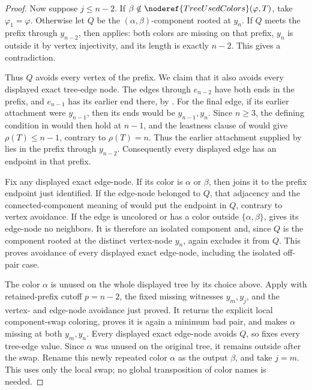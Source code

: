 \begin{proof}
Now suppose \(j\le n-2\).  If \(\beta\notin
\noderef{TreeUsedColors}(\varphi,T)\), take \(\varphi_1=\varphi\).
Otherwise let \(Q\) be the \((\alpha,\beta)\)-component rooted at
\(y_n\).  If \(Q\) meets the prefix through \(y_{n-2}\), then
 applies: both colors
are missing on that prefix, \(y_n\) is outside it by vertex injectivity,
and its length is exactly \(n-2\).  This gives a contradiction.

Thus \(Q\) avoids every vertex of the prefix.  We claim that it also
avoids every displayed exact tree-edge node.  The edges through
\(e_{n-2}\) have both ends in the prefix, and \(e_{n-1}\) has its earlier
end there, by .  For the final edge, if its earlier
attachment were \(y_{n-1}\), then its ends would be
\(y_{n-1},y_n\).  Since \(n\ge3\), the defining condition in
 would then hold at \(n-1\), and the
leastness clause of  would give
\(\rho(T)\le n-1\), contrary to \(\rho(T)=n\).  Thus the earlier
attachment supplied by  lies in the prefix through
\(y_{n-2}\).  Consequently every displayed edge has an endpoint in that
prefix.

Fix any displayed exact edge-node.  If its color is \(\alpha\) or
\(\beta\), then  joins it to the
prefix endpoint just identified.  If the edge-node belonged to \(Q\),
that adjacency and the connected-component meaning of
 would put the endpoint in \(Q\), contrary to
vertex avoidance.  If the edge is uncolored or has a color outside
\(\{\alpha,\beta\}\),  gives its
edge-node no neighbors.  It is therefore an isolated component and,
since \(Q\) is the component rooted at the distinct vertex-node \(y_n\),
 again excludes it from \(Q\).  This proves
avoidance of every displayed exact edge-node, including the isolated
off-pair case.

The color \(\alpha\) is unused on the whole displayed tree by its
choice above.  Apply 
with retained-prefix cutoff \(p=n-2\), the fixed missing witnesses
\(y_m,y_j\), and the vertex- and edge-node avoidance just proved.  It
returns the explicit local component-swap coloring, proves it is again a
minimum bad pair, and makes \(\alpha\) missing at both \(y_m,y_n\).
Every displayed exact edge-node avoids \(Q\), so
 fixes every tree-edge value.  Since
\(\alpha\) was unused on the original tree, it remains outside
 after the swap.  Rename this newly repeated
color \(\alpha\) as the output \(\beta\), and take \(j=m\).  This uses
only the local swap; no global transposition of color names is needed.
\end{proof}
